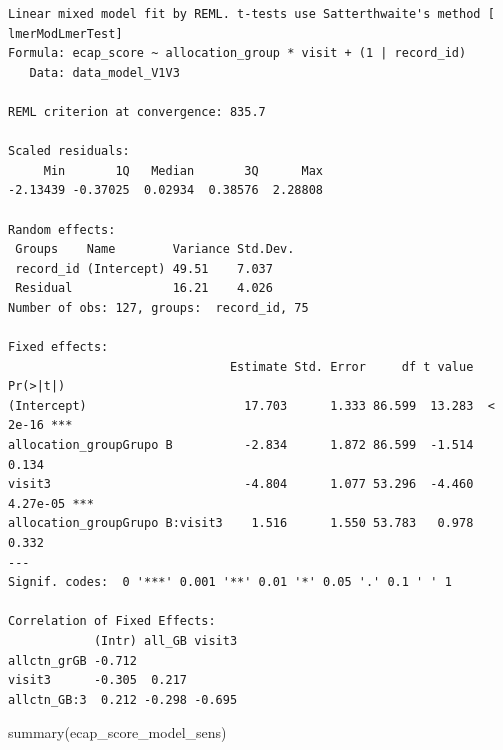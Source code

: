 \documentclass[
  letterpaper,
  DIV=11,
  numbers=noendperiod]{scrartcl}
\newenvironment{Shaded}{\begin{snugshade}}{\end{snugshade}}
\newcommand{\FunctionTok}[1]{\textcolor[rgb]{0.28,0.35,0.67}{#1}}
\newcommand{\NormalTok}[1]{\textcolor[rgb]{0.00,0.23,0.31}{#1}}
\begin{document}
\begin{verbatim}
Linear mixed model fit by REML. t-tests use Satterthwaite's method [
lmerModLmerTest]
Formula: ecap_score ~ allocation_group * visit + (1 | record_id)
   Data: data_model_V1V3

REML criterion at convergence: 835.7

Scaled residuals: 
     Min       1Q   Median       3Q      Max 
-2.13439 -0.37025  0.02934  0.38576  2.28808 

Random effects:
 Groups    Name        Variance Std.Dev.
 record_id (Intercept) 49.51    7.037   
 Residual              16.21    4.026   
Number of obs: 127, groups:  record_id, 75

Fixed effects:
                               Estimate Std. Error     df t value Pr(>|t|)    
(Intercept)                      17.703      1.333 86.599  13.283  < 2e-16 ***
allocation_groupGrupo B          -2.834      1.872 86.599  -1.514    0.134    
visit3                           -4.804      1.077 53.296  -4.460 4.27e-05 ***
allocation_groupGrupo B:visit3    1.516      1.550 53.783   0.978    0.332    
---
Signif. codes:  0 '***' 0.001 '**' 0.01 '*' 0.05 '.' 0.1 ' ' 1

Correlation of Fixed Effects:
            (Intr) all_GB visit3
allctn_grGB -0.712              
visit3      -0.305  0.217       
allctn_GB:3  0.212 -0.298 -0.695
\end{verbatim}

\begin{Shaded}
\begin{Highlighting}[]
\FunctionTok{summary}\NormalTok{(ecap\_score\_model\_sens)}
\end{Highlighting}
\end{Shaded}
\end{document}
